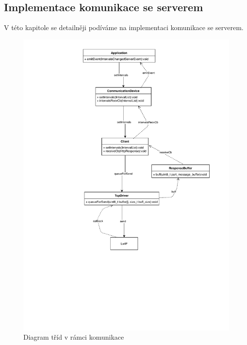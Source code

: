 
\subsection{Implementace komunikace se serverem}
V této kapitole se detailněji podíváme na implementaci komunikace se serverem.

\begin{figure}[H]\centering
\includegraphics[scale=0.8]{../diagrams/stm_implementace_komunikace.pdf}
\caption{Diagram tříd v rámci komunikace}
\label{stm-implementace-komunikace}
\end{figure}

